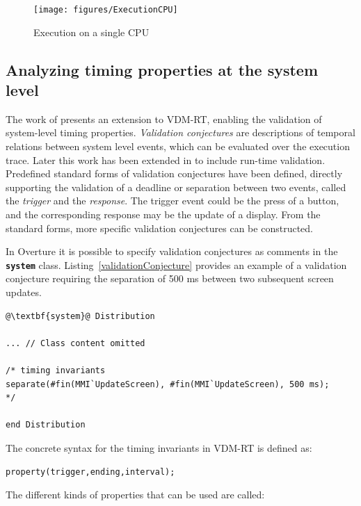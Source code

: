 \documentclass{overturerepchap}
\begin{document}
\begin{figure}[htp]
\begin{center}
  \texttt{[image: figures/ExecutionCPU]}
  \caption{Execution on a single CPU}
  \label{fig:userguide:ExecutionCPU}
\end{center}
\end{figure}

\subsection*{Analyzing timing properties at the system level}

The work of\cite{Fitzgerald&07b} presents an extension to VDM-RT, enabling the validation of system-level timing properties. \textit{Validation conjectures} are descriptions of temporal relations between system level events, which can be evaluated over the execution trace. Later this work has been extended in\cite{Ribeiro&11} to include run-time validation. Predefined standard forms of validation conjectures have been defined, directly supporting the validation of a deadline or separation between two events, called the \textit{trigger} and the \textit{response}. The trigger event could be the press of a button, and the corresponding response may be the update of a display. From the standard forms, more specific validation conjectures can be constructed.

In Overture it is possible to specify validation conjectures as comments in the \textbf{\texttt{system}} class. Listing~\ref{validationConjecture} provides an example of a validation conjecture requiring the separation of 500 ms between two subsequent screen updates.

\begin{lstlisting}[language=VDM++,label=validationConjecture,caption=Validation conjecture example,captionpos=b,escapechar=@]
@\textbf{system}@ Distribution

... // Class content omitted

/* timing invariants
separate(#fin(MMI`UpdateScreen), #fin(MMI`UpdateScreen), 500 ms);
*/

end Distribution
\end{lstlisting}

The concrete syntax for the timing invariants in VDM-RT is defined as:
\begin{lstlisting}
property(trigger,ending,interval);
\end{lstlisting}

The different kinds of properties that can be used are called:
\end{document}
